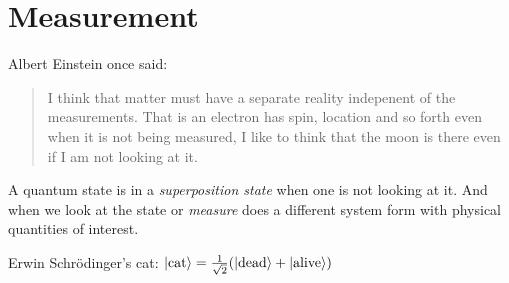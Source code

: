 \section{Measurement}

Albert Einstein once said:
\begin{quote}
I think that matter must have a 
separate reality indepenent of the measurements. 
That is an electron has spin, location and so forth even when 
it is not being measured, I like to think that the moon is there even if 
I am not looking at it.
\end{quote}

A quantum state is in a \textit{superposition state} when 
one is not looking at it. And when we look at the state 
or \textit{measure} does a different system form with 
physical quantities of interest. 


Erwin Schr\"{o}dinger's cat: 
$\left|\text{cat}\right\rangle = \frac{1}{\sqrt{2}} (\left|\text{dead}\right\rangle + \left|\text{alive}\right\rangle)$